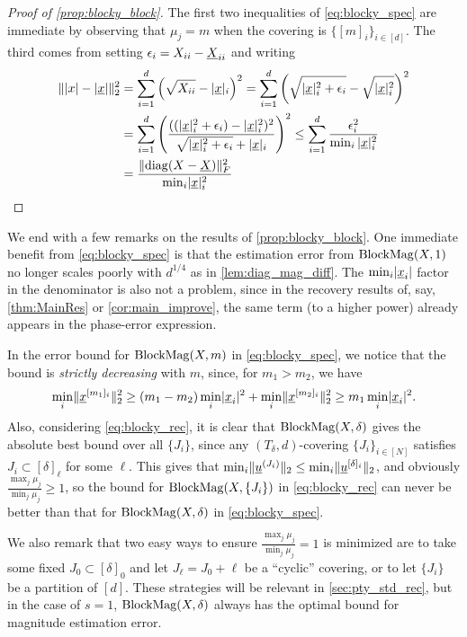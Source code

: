 \begin{proof}[Proof of \cref{prop:blocky_block}]
  The first two inequalities of \eqref{eq:blocky_spec} are immediate by observing that $\mu_j = m$ when the covering is $\{[m]_i\}_{i \in [d]}$.  The third comes from setting $\epsilon_i = X_{ii} - \underline{X}_{ii}$ and writing
  \begin{align*}
    \lVert\lvert x\rvert - \lvert\underline{x}\rvert\rVert_2^2 &= \sum_{i = 1}^d \left(\sqrt{X_{ii}} - \lvert\underline{x}\rvert_i\right)^2 = \sum_{i = 1}^d \left(\sqrt{\lvert\underline{x}\rvert_i^2 + \epsilon_i} - \sqrt{\lvert\underline{x}\rvert_i^2}\right)^2 \\
    &= \sum_{i = 1}^d \left(\frac{((\lvert\underline{x}\rvert_i^2 + \epsilon_i) - \lvert\underline{x}\rvert_i^2)^2}{\sqrt{\lvert\underline{x}\rvert_i^2 + \epsilon_i} + \lvert\underline{x}\rvert_i}\right)^2 \le \sum_{i = 1}^d \frac{\epsilon_i^2}{\min_i{\lvert\underline{x}\rvert_i^2}} \\
    &= \frac{\lVert\operatorname{diag}(X - \underline{X})\rVert_F^2}{\min_i \lvert\underline{x}\rvert_i^2}
  \end{align*}  
\end{proof}

We end with a few remarks on the results of \cref{prop:blocky_block}.  One immediate benefit from \cref{eq:blocky_spec} is that the estimation error from $\operatorname{BlockMag}(X, 1)$ no longer scales poorly with $d^{1/4}$ as in \cref{lem:diag_mag_diff}.  The $\min_i \lvert\underline{x}_i\rvert$ factor in the denominator is also not a problem, since in the recovery results of, say, \cref{thm:MainRes} or \cref{cor:main_improve}, the same term (to a higher power) already appears in the phase-error expression.

In the error bound for $\operatorname{BlockMag}(X, m)$ in \cref{eq:blocky_spec}, we notice that the bound is \emph{strictly decreasing} with $m$, since, for $m_1 > m_2$, we have \[\min_i \lVert\underline{x}^{[m_1]_i}\rVert_2^2 \ge (m_1 - m_2) \min_i \lvert\underline{x}_i\rvert^2 + \min_i \lVert\underline{x}^{[m_2]_i}\rVert_2^2 \ge m_1 \min_i \lvert\underline{x}_i\rvert^2.\]  Also, considering \eqref{eq:blocky_rec}, it is clear that $\operatorname{BlockMag}(X, \delta)$ gives the absolute best bound over all $\{J_i\}$, since any $(T_\delta, d)$-covering $\{J_i\}_{i \in [N]}$ satisfies $J_i \subset [\delta]_\ell$ for some $\ell$.  This gives that $\min_i \lVert\underline{u}^{(J_i)}\rVert_2 \le \min_i \lVert\underline{u}^{[\delta]_i}\rVert_2$, and obviously $\frac{\max_j \mu_j}{\min_j \mu_j} \ge 1$, so the bound for $\operatorname{BlockMag}(X, \{J_i\})$ in \eqref{eq:blocky_rec} can never be better than that for $\operatorname{BlockMag}(X, \delta)$ in \eqref{eq:blocky_spec}.

We also remark that two easy ways to ensure $\frac{\max_j \mu_j}{\min_j \mu_j} = 1$ is minimized are to take some fixed $J_0 \subset [\delta]_0$ and let $J_\ell = J_0 + \ell$ be a ``cyclic'' covering, or to let $\{J_i\}$ be a partition of $[d]$.  These strategies will be relevant in \cref{sec:pty_std_rec}, but in the case of $s = 1$, $\operatorname{BlockMag}(X, \delta)$ always has the optimal bound for magnitude estimation error.

